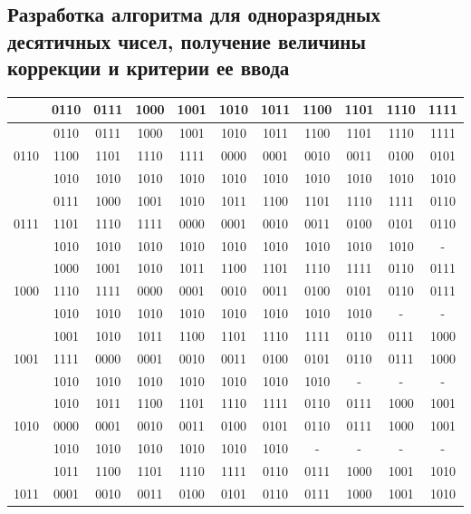\documentclass[a4paper,14pt]{article}
\begin{document}
\subsection{Разработка алгоритма для одноразрядных десятичных чисел, получение величины коррекции и критерии ее ввода}

\begin{table}[H]
	\centering
	\begin{tabular}{|c|c|c|c|c|c|c|c|c|c|c|}
		\hline
		     & 0110 & 0111 & 1000 & 1001 & 1010 & 1011 & 1100 & 1101 & 1110 & 1111 \\ \hline
		     & 0110 & 0111 & 1000 & 1001 & 1010 & 1011 & 1100 & 1101 & 1110 & 1111 \\
		0110 & 1100 & 1101 & 1110 & 1111 & 0000 & 0001 & 0010 & 0011 & 0100 & 0101 \\
		     & 1010 & 1010 & 1010 & 1010 & 1010 & 1010 & 1010 & 1010 & 1010 & 1010 \\ \hline
		     & 0111 & 1000 & 1001 & 1010 & 1011 & 1100 & 1101 & 1110 & 1111 & 0110 \\
		0111 & 1101 & 1110 & 1111 & 0000 & 0001 & 0010 & 0011 & 0100 & 0101 & 0110 \\
		     & 1010 & 1010 & 1010 & 1010 & 1010 & 1010 & 1010 & 1010 & 1010 &  -   \\ \hline
		     & 1000 & 1001 & 1010 & 1011 & 1100 & 1101 & 1110 & 1111 & 0110 & 0111 \\
		1000 & 1110 & 1111 & 0000 & 0001 & 0010 & 0011 & 0100 & 0101 & 0110 & 0111 \\
		     & 1010 & 1010 & 1010 & 1010 & 1010 & 1010 & 1010 & 1010 &  -   &  -   \\ \hline
		     & 1001 & 1010 & 1011 & 1100 & 1101 & 1110 & 1111 & 0110 & 0111 & 1000 \\
		1001 & 1111 & 0000 & 0001 & 0010 & 0011 & 0100 & 0101 & 0110 & 0111 & 1000 \\
		     & 1010 & 1010 & 1010 & 1010 & 1010 & 1010 & 1010 &  -   &  -   &  -   \\ \hline
		     & 1010 & 1011 & 1100 & 1101 & 1110 & 1111 & 0110 & 0111 & 1000 & 1001 \\
		1010 & 0000 & 0001 & 0010 & 0011 & 0100 & 0101 & 0110 & 0111 & 1000 & 1001 \\
		     & 1010 & 1010 & 1010 & 1010 & 1010 & 1010 &  -   &  -   &  -   &  -   \\ \hline
		     & 1011 & 1100 & 1101 & 1110 & 1111 & 0110 & 0111 & 1000 & 1001 & 1010 \\
		1011 & 0001 & 0010 & 0011 & 0100 & 0101 & 0110 & 0111 & 1000 & 1001 & 1010 \\

\end{tabular}
\end{table}
\end{document}
